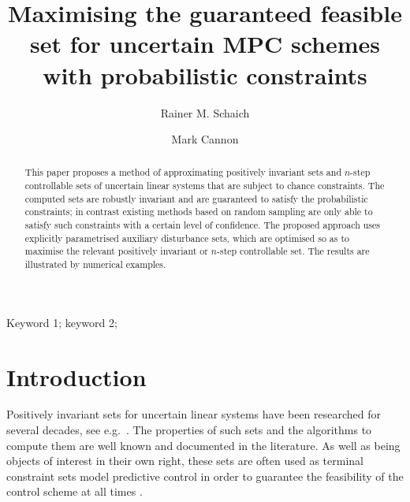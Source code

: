 \documentclass{ifacconf}
\begin{document}
\begin{frontmatter}

\title{Maximising the guaranteed feasible set for uncertain MPC schemes with probabilistic constraints}%


\author{Rainer M. Schaich} 
\qquad\qquad\author{Mark Cannon}


\address{\mbox{Department of Engineering Science, University of Oxford, OX1 3PJ, UK} e-mail: \{rainer.schaich,mark.cannon\}@eng.ox.ac.uk}


          
\begin{keyword}                           %
Keyword 1; keyword 2;
\end{keyword}                             %


\begin{abstract}                          %
This paper proposes a method of approximating positively invariant sets and $n$-step controllable sets of uncertain linear systems that are subject to chance constraints. The computed sets are robustly invariant and are guaranteed to satisfy the probabilistic constraints; in contrast existing methods based on random sampling are only able to satisfy such constraints with a certain level of confidence. The proposed approach uses explicitly parametrised auxiliary disturbance sets, which are optimised so as to maximise the relevant positively invariant or $n$-step controllable set. The results are illustrated by numerical examples.
\end{abstract}

\end{frontmatter}


\section{Introduction}
%
%
Positively invariant sets for uncertain linear systems have been researched for several decades, see e.g.~\cite{Kolmanovsky:1995,Kolmanovsky:1998,blanchini:2007}.
%
The properties of such sets and the algorithms to compute them are well known and documented in the literature.
%
As well as being objects of interest in their own right,
these sets are often used as terminal constraint sets model predictive control in order to guarantee the feasibility of the control scheme at all times \citep[see e.g.][]{Mayne2014}.
%
\end{document}
